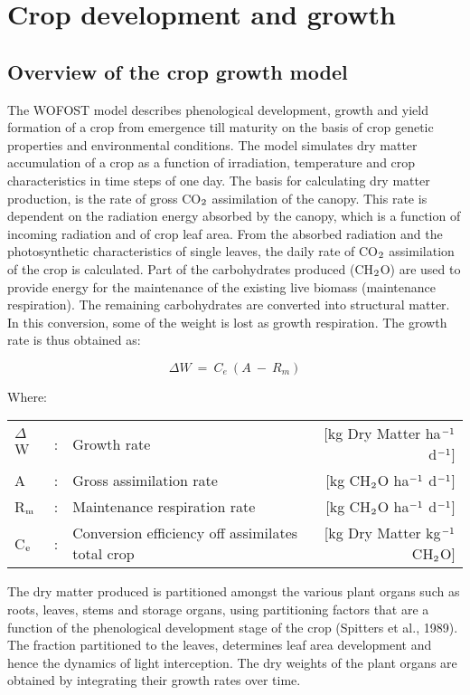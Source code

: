 \chapter{Crop development and growth}

\section{Overview of the crop growth model}

The WOFOST model describes phenological development, growth and yield formation of
a crop from emergence till maturity on the basis of crop genetic properties and 
environmental conditions. The model simulates dry matter accumulation of a crop as a function
of irradiation, temperature and crop characteristics in time steps of one day. 
The basis for calculating dry matter production, is the rate of gross CO$_{{\rm 2}}$ assimilation of
the canopy. This rate is dependent on the radiation energy absorbed by the canopy, which
is a function of incoming radiation and of crop leaf area. From the absorbed radiation and
the photosynthetic characteristics of single leaves, the daily rate of CO$_{{\rm 2}}$ assimilation of the
crop is calculated. Part of the carbohydrates produced (CH$_{{\rm 2}}$O) are used to provide energy
for the maintenance of the existing live biomass (maintenance respiration). The remaining
carbohydrates are converted into structural matter. In this conversion, some of the weight
is lost as growth respiration. The growth rate is thus obtained as:

\begin{equation}
\Delta W ~=~ C _{e} ~( A ~-~ R _{m} )
\end{equation}

Where:\\[5pt]
\begin{tabularx}{\textwidth}{llXr}
	$\Delta$W &:& Growth rate    &   
	[kg Dry Matter ha$^{{\rm -1}}$ d$^{{\rm -1}}$]\\
	A  &:& Gross assimilation   rate &  
	[kg CH$_{{\rm 2}}$O ha$^{{\rm -1}}$ d$^{{\rm -1}}$]\\
	R$_{{\rm m}}$  &:& Maintenance respiration rate    &  
	[kg CH$_{{\rm 2}}$O ha$^{{\rm -1}}$ d$^{{\rm -1}}$]\\
	C$_{{\rm e}}$ &:& Conversion efficiency off assimilates total crop   &   
	[kg Dry Matter kg$^{{\rm -1}}$ CH$_{{\rm 2}}$O]\\
\end{tabularx}

The dry matter produced is partitioned amongst the various plant organs such as roots,
leaves, stems and storage organs, using partitioning factors that are a function of the
phenological development stage of the crop (Spitters et al., 1989). The fraction partitioned
to the leaves, determines leaf area development and hence the dynamics of light interception. 
The dry weights of the plant organs are obtained by integrating their growth rates over time.

